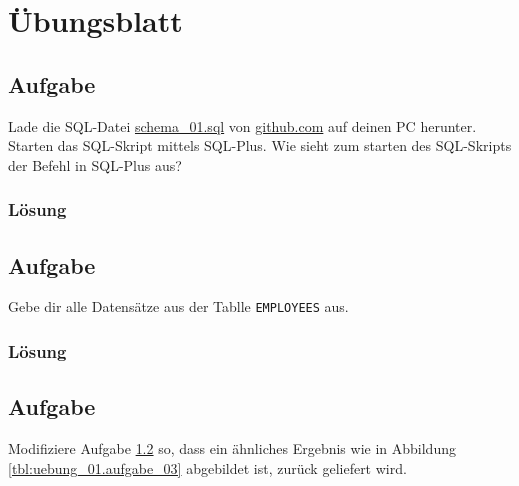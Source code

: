 \section{Übungsblatt}
\label{sec:uebung_01}

\subsection{Aufgabe}
\label{sec:uebung_01.aufgabe_01}
Lade die SQL-Datei \href{https://github.com/fh-trier/tgdb_ws1819/sql/schema.sql}{schema\_01.sql} von \href{https://github.com/fh-trier/tgdb_ws1819/sql/schema\_01.sql}{github.com} auf deinen PC herunter. Starten das SQL-Skript mittels SQL-Plus. Wie sieht zum starten des SQL-Skripts der Befehl in SQL-Plus aus?

\subsubsection*{Lösung}
\label{sec:uebung_01.aufgabe_01.loesung}

\subsection{Aufgabe}
\label{sec:uebung_01.aufgabe_02}
Gebe dir alle Datensätze aus der Tablle \texttt{EMPLOYEES} aus.

\subsubsection*{Lösung}
\label{sec:uebung_01.aufgabe_02.loesung}

\subsection{Aufgabe}
\label{sec:uebung_01.aufgabe_03}
Modifiziere Aufgabe \ref{sec:uebung_01.aufgabe_02} so, dass ein ähnliches Ergebnis wie in Abbildung \ref{tbl:uebung_01.aufgabe_03} abgebildet ist, zurück geliefert wird.


